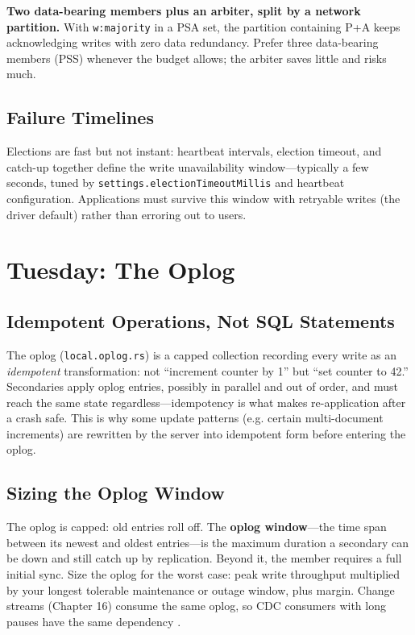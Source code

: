 \begin{pitfall}
\textbf{Two data-bearing members plus an arbiter, split by a network partition.} With \texttt{w:majority} in a PSA set, the partition containing P+A keeps acknowledging writes with zero data redundancy. Prefer three data-bearing members (PSS) whenever the budget allows; the arbiter saves little and risks much.
\end{pitfall}

\subsection{Failure Timelines}
Elections are fast but not instant: heartbeat intervals, election timeout, and catch-up together define the write unavailability window---typically a few seconds, tuned by \texttt{settings.electionTimeoutMillis} and heartbeat configuration. Applications must survive this window with retryable writes (the driver default) rather than erroring out to users.

\section{Tuesday: The Oplog}
\subsection{Idempotent Operations, Not SQL Statements}
The oplog (\texttt{local.oplog.rs}) is a capped collection recording every write as an \emph{idempotent} transformation: not ``increment counter by 1'' but ``set counter to 42.'' Secondaries apply oplog entries, possibly in parallel and out of order, and must reach the same state regardless---idempotency is what makes re-application after a crash safe. This is why some update patterns (e.g. certain multi-document increments) are rewritten by the server into idempotent form before entering the oplog.

\subsection{Sizing the Oplog Window}
The oplog is capped: old entries roll off. The \textbf{oplog window}---the time span between its newest and oldest entries---is the maximum duration a secondary can be down and still catch up by replication. Beyond it, the member requires a full initial sync. Size the oplog for the worst case: peak write throughput multiplied by your longest tolerable maintenance or outage window, plus margin. Change streams (Chapter 16) consume the same oplog, so CDC consumers with long pauses have the same dependency \cite{mongodbReplicationDocs,mongodbOplogDocs}.


